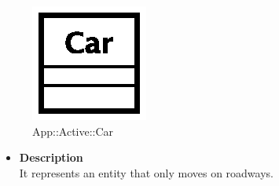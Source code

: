 \begin{figure}[h]
\centering
\includegraphics[scale=0.6,keepaspectratio]{images/solution/car.eps}
\caption{App::Active::Car}
\label{fig:sd-app-car}
\end{figure}
\begin{itemize}
  \item \textbf{Description} \\
It represents an entity that only moves on roadways.
\end{itemize} 
